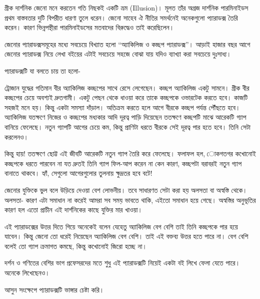 \documentclass[
]{book}
\begin{document}
গ্রীক দার্শনিক জেনো মনে করতেন গতি নিছকই একটি ভ্রম (Illusion)। মূলত তাঁর অগ্রজ দার্শনিক পারমিনাইডস প্রথম বাস্তবতার দুটি বিপরীত ধারণা তুলে ধরেন। জেনো সাহেব ঐ নীতির সমর্থনেই অনেকগুলো প্যারাডক্স তৈরি করেন। কারণ ভিন্নপন্থীরা পারমিনাইডসের মতবাদের বিরুদ্ধেও তাই করেছিলেন।

জেনোর প্যারাডক্সসমূহের মধ্যে সবচেয়ে বিখ্যাত হলো ``অ্যাকিলিজ ও কচ্ছপ প্যারাডক্স''। আড়াই হাজার বছর আগে জেনোর প্যারাডক্স নিয়ে লেখা বইয়ের এটাই সবচেয়ে সহজে বোঝা যায় যদিও ব্যাখ্যা করা সবচেয়ে দুঃসাধ্য।~

প্যারাডক্সটি যা বলতে চায় তা হলো-

ট্রোজান যুদ্ধের গতিমান বীর অ্যাকিলিজ কচ্ছপের সাথে রেসে লেগেছেন। কচ্ছপ অ্যাকিলিজ একটু সামনে। গ্রীক বীর কচ্ছপের চেয়ে অবশ্যই দ্রুতগামী। একটু পেছন থেকে ধাওয়া করে তাকে কচ্ছপকে ওভারটেক করতে হবে। কাজটি সহজই মনে হয়। কিন্তু একটা সমস্যা দাঁড়াল। অতিক্রম করতে হলে আগে বীরকে কচ্ছপ পর্যন্ত পৌঁছতে হবে। অ্যাকিলিজ যতক্ষণে নিজের ও কচ্ছপের মধ্যকার আদি দূরত্ব পাড়ি দিয়েছেন ততক্ষণে কচ্ছপটি মাঝে আরেকটি গ্যাপ বানিয়ে ফেলেছে। নতুন গ্যাপটি আগের চেয়ে কম, কিন্তু প্রাণিটা ধরতে বীরকে সেই দূরত্ব পার হতে হবে। তিনি সেটা করলেনও।~

কিন্তু হায়! ততক্ষণে ছোট্ট এই জীবটি আরেকটি নতুন গ্যাপ তৈরি করে ফেলেছে। ফলাফল হল, োকগতগর কখোনোই কচ্ছপকে ধরতে পারবেন না যত দ্রুতই তিনি গ্যাপ ফিল-আপ করেন না কেন কারণ, কচ্ছপটা বরাবরই নতুন গ্যাপ বানাতে থাকবে। হ্যাঁ, সেগুলো আগেরগুলোর তুলনায় ক্ষুদ্রতর হবে বটে!~

জেনোর যুক্তিকে ভুল বলে উড়িয়ে দেওয়া বেশ লোভনীয়। তবে সাধারণত সেটা করা হয় অলসতা বা অস্বস্তি থেকে। অলসতা- কারণ এটা সমাধান না করেই আমরা সব সময় ভাবতে থাকি, এইতো সমাধান হয়ে গেছে। অস্বস্তির অনুভূতির কারণ হল এতো প্রাচীন এই দার্শনিকের কাছে যুক্তির মার খাওয়া।~

এই প্যারাডক্সের উত্তর দিতে গিয়ে অনেকেই বলেন যেহেতু অ্যাকিলিজ বেগ বেশি তাই তিনি কচ্ছপকে পার হয়ে যাবেন। কিন্তু জেনো তো ধরেই নিয়েছেন অ্যাকিলিজ বেগ বেশি। তাই এই বক্তব্য উত্তর হতে পারে না। বেগ বেশি বলেই তো গ্যাপ ক্রমাগত কমছে, কিন্তু কখোনোই জিরো হচ্ছে না।~

দর্শন ও গণিতের বেশির ভাগ প্রফেসরদের মতে শুধু এই প্যারাডক্সটি নিয়েই একটা বই লিখে ফেলা যেতে পারে। অনেকে লিখেছেনও।~

আসুন সংক্ষেপে প্যারাডক্সটি ভাঙ্গার চেষ্টা করি।~
\end{document}

